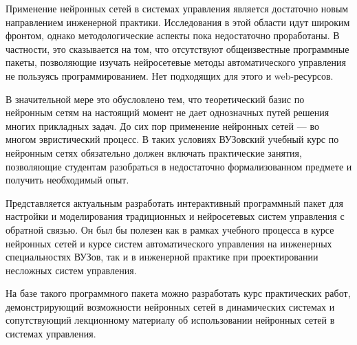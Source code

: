 


Применение нейронных сетей в системах управления является достаточно
новым направлением инженерной практики.  Исследования в этой области
идут широким фронтом, однако методологические аспекты пока
недостаточно проработаны.  В частности, это сказывается на том, что
отсутствуют общеизвестные программные пакеты, позволяющие изучать
нейросетевые методы автоматического управления не пользуясь
программированием.  Нет подходящих для этого и web-ресурсов.

В значительной мере это обусловлено тем, что теоретический базис по
нейронным сетям на настоящий момент не дает однозначных путей решения
многих прикладных задач.  До сих пор применение нейронных сетей --- во
многом эвристический процесс.  В таких условиях ВУЗовский учебный курс
по нейронным сетях обязательно должен включать практические занятия,
позволяющие студентам разобраться в недостаточно формализованном
предмете и получить необходимый опыт.

Представляется актуальным разработать интерактивный программный пакет
для настройки и моделирования традиционных и нейросетевых систем
управления с обратной связью.  Он был бы полезен как в рамках учебного
процесса в курсе нейронных сетей и курсе систем автоматического
управления на инженерных специальностях ВУЗов, так и в инженерной
практике при проектировании несложных систем управления.

На базе такого программного пакета можно разработать курс практических
работ, демонстрирующий возможности нейронных сетей в динамических
системах и сопутствующий лекционному материалу об использовании
нейронных сетей в системах управления.

